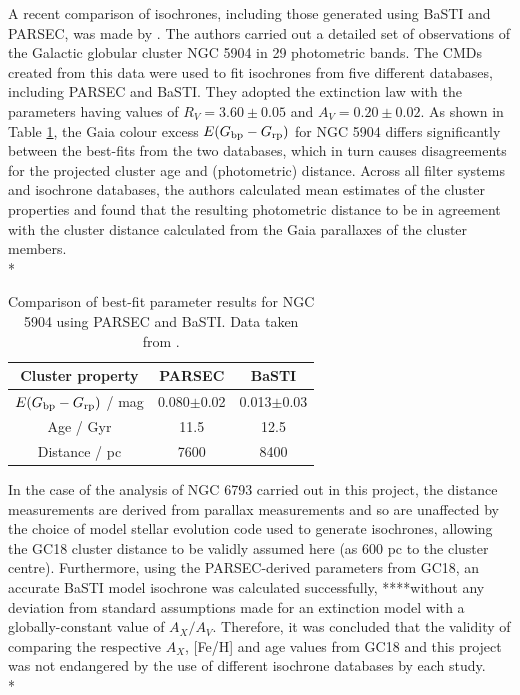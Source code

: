 \documentclass[12pt, a4paper]{report}
\begin{document}
A recent comparison of isochrones, including those generated using BaSTI and PARSEC, was made by \cite{2019MNRAS.483.4949G}. The authors carried out a detailed set of observations of the Galactic globular cluster NGC 5904 in 29 photometric bands. The CMDs created from this data were used to fit isochrones from five different databases, including PARSEC and BaSTI. They adopted the \cite{1989ApJ...345..245C} extinction law with the parameters having values of $R_{V} = 3.60\pm0.05$ and $A_{V} = 0.20\pm0.02$. As shown in Table \ref{NGC5904_obs_gontcharov}, the Gaia colour excess $E(G_{\textnormal{bp}} - G_{\textnormal{rp}})$ for NGC 5904 differs significantly between the best-fits from the two databases, which in turn causes disagreements for the projected cluster age and (photometric) distance. Across all filter systems and isochrone databases, the authors calculated mean estimates of the cluster properties and found that the resulting photometric distance to be in agreement with the cluster distance calculated from the Gaia parallaxes of the cluster members.\\*

\begin{table}
\begin{center}
\begin{tabular}{ccc}
\hline
Cluster property & PARSEC & BaSTI \\
\hline
$E(G_{\textnormal{bp}} - G_{\textnormal{rp}})$ / mag & 0.080$\pm$0.02 & 0.013$\pm$0.03 \\
Age / Gyr & 11.5 & 12.5 \\
Distance / pc & 7600 & 8400 \\
\hline
\end{tabular}
\caption{Comparison of best-fit parameter results for NGC 5904 using PARSEC and BaSTI. Data taken from \cite{2019MNRAS.483.4949G}.}
\label{NGC5904_obs_gontcharov}
\end{center}
\end{table}

In the case of the analysis of NGC 6793 carried out in this project, the distance measurements are derived from parallax measurements and so are unaffected by the choice of model stellar evolution code used to generate isochrones, allowing the GC18 cluster distance to be validly assumed here (as 600 pc to the cluster centre). Furthermore, using the PARSEC-derived parameters from GC18, an accurate BaSTI model isochrone was calculated successfully, ****without any deviation from standard assumptions made for an extinction model with a globally-constant value of $A_{X}/A_{V}$. Therefore, it was concluded that the validity of comparing the respective $A_{X}$, [Fe/H] and age values from GC18 and this project was not endangered by the use of different isochrone databases by each study.\\*
\end{document}

